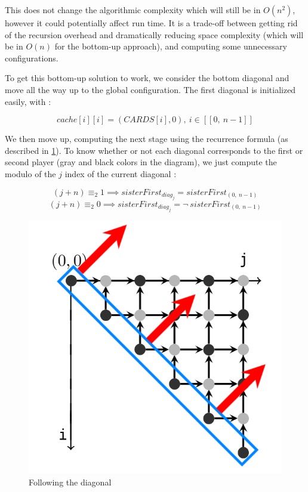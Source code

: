 \documentclass[a4paper,12pt,fleqn]{article}
\newcommand\ezskip{\medskip\noindent}
\begin{document}
\medskip
This does not change the algorithmic complexity which will still be in $O(n^2)$, however it could potentially affect run time. It is a trade-off between getting rid of the recursion overhead and dramatically reducing space complexity (which will be in $O(n)$ for the bottom-up approach), and computing some unnecessary configurations.

\ezskip
To get this bottom-up solution to work, we consider the bottom diagonal and move all the way up to the global configuration.
The first diagonal is initialized easily, with :

\begin{equation}
cache[i][i] = (CARDS[i], 0), \ i \in [\![0,\ n-1]\!] 
\end{equation}

We then move up, computing the next stage using the recurrence formula (as described in \ref{fig:tabulation_02}). To know whether or not each diagonal corresponds to the first or second player (gray and black colors in the diagram), we just compute the modulo of the $j$ index of the current diagonal :

\begin{equation}
(j + n) \equiv_{2} 1 \implies sisterFirst_{diag_j} = sisterFirst_{(0,\ n-1)}
\end{equation}
\begin{equation}
(j + n) \equiv_{2} 0 \implies sisterFirst_{diag_j} = \neg \ sisterFirst_{(0,\ n-1)}
\end{equation}

\begin{figure}[H]
    \centering
    \includegraphics[scale=0.5]{tabulation_02.png}

    \caption{Following the diagonal}
    \label{fig:tabulation_02}
\end{figure}
\end{document}
